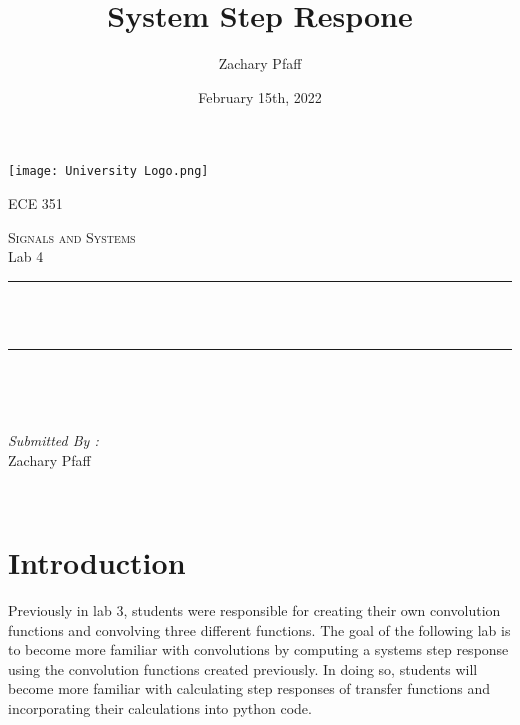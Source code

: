 \documentclass[12pt]{report}
\title{System Step Respone}
\author{Zachary Pfaff}
\date{February 15th, 2022}
\makeatletter
\let\thetitle\@title
\makeatother
\begin{document}
\begin{titlepage}
\centering
\vspace*{0.5 cm}
\texttt{[image: University Logo.png]}\\
\begin{center}    \textsc{\Large   ECE 351}\\[2.0 cm]
\end{center}%
\textsc{\Large Signals and Systems  }\\[0.5 cm] %
Lab 4
\rule{\linewidth}{0.2 mm} \\[0.4 cm]
{ \huge \bfseries \thetitle}\\
\rule{\linewidth}{0.2 mm} \\[1.5 cm]
\begin{minipage}{0.4\textwidth}
\begin{flushleft} \large
\end{flushleft}
\end{minipage}~
\begin{minipage}{0.4\textwidth}
\begin{flushright} \large
\emph{Submitted By :} \\
Zachary Pfaff
\end{flushright}
\end{minipage}\\[2 cm]
\end{titlepage}
\tableofcontents
\pagebreak
\renewcommand{\thesection}{\arabic{section}}
\setlength{\parindent}{20pt}

\maketitle
\section{Introduction}
\hspace{\parindent}Previously in lab 3, students were responsible for creating their own convolution functions and convolving three different functions. The goal of the following lab is to become more familiar with convolutions by computing a systems step response using the convolution functions created previously. In doing so, students will become more familiar with calculating step responses of transfer functions and incorporating their calculations into python code.
\end{document}
